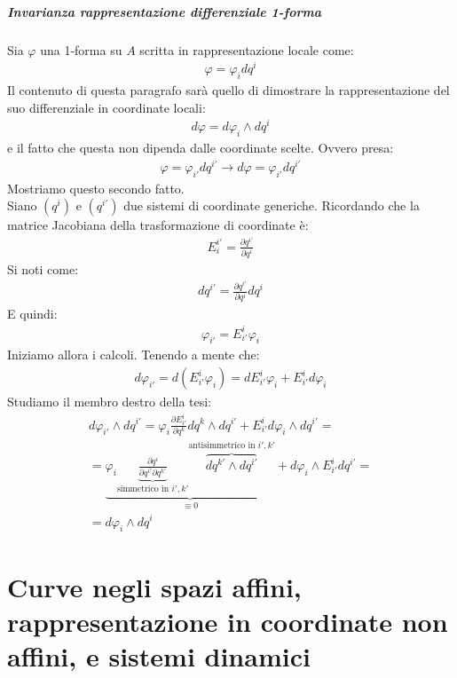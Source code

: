\paragraph{Invarianza rappresentazione differenziale 1-forma}
Sia $\varphi$ una 1-forma su $A$ scritta in rappresentazione locale come:
\begin{align*}
    \varphi = \varphi_idq^i
\end{align*}
Il contenuto di questa paragrafo sarà quello di dimostrare la rappresentazione del suo differenziale in coordinate locali:
\begin{align*}
    d\varphi=d\varphi _i\wedge dq^i
\end{align*}
e il fatto che questa non dipenda dalle coordinate scelte. Ovvero presa:
\begin{align*}
    \varphi = \varphi_{i'}dq^{i'}\longrightarrow d\varphi = \varphi_{i'}dq^{i'}
\end{align*}
Mostriamo questo secondo fatto.\\
Siano $(q^i)$ e $(q^{i'})$ due sistemi di coordinate generiche. Ricordando che la matrice Jacobiana della trasformazione di coordinate è:
\begin{align*}
    E^{i'}_i=\frac{\partial q^{i'}}{\partial q^i}
\end{align*}
Si noti come:
\begin{align*}
    dq^{i'}=\frac{\partial q^{i'}}{\partial q^i}dq^i
\end{align*}
E quindi:
\begin{align*}
    \varphi_{i'}=E^i_{i'}\varphi_i
\end{align*}
Iniziamo allora i calcoli. Tenendo a mente che:
\begin{align*}
    d\varphi_{i'}=d(E^i_{i'}\varphi_i)=dE^i_{i'}\varphi_i+E^i_{i'}d\varphi_i
\end{align*}
Studiamo il membro destro della tesi:
\begin{align*}
    d\varphi_{i'}\wedge dq^{i'}=\varphi_i\frac{\partial E^{i}_{i'}}{\partial q^k}dq^k\wedge dq^{i'}+E^i_{i'}d\varphi_i\wedge dq^{i'}=\\
    =\underbrace{\varphi_i\underbrace{\frac{\partial q^i}{\partial q^{i'} \partial q^{k'}}}_{\text{simmetrico in $i',k'$}}\overbrace{dq^{k'}\wedge dq^{i'}}^{\text{antisimmetrico in $i',k'$}}}_{\equiv 0}+d\varphi_i\wedge E^i_{i'}dq^{i'}=\\
    =d\varphi_i\wedge dq^i
\end{align*}
\chapter{Curve negli spazi affini, rappresentazione in coordinate non affini, e sistemi dinamici}
